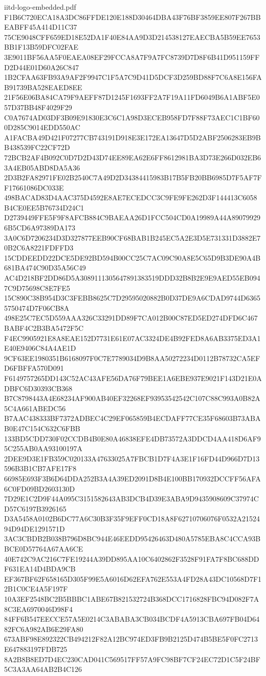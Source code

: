 \begin{filecontents*}[overwrite]{iitd-logo-embedded.pdf}
F1B6C720ECA18A3DC86FFDE120E188D30464DBA43F76BF3859EE807F267BBEABFF45A414D11C37
75CE9048CFF659ED18E52DA1F40E84AA9D3D214538127EAECBA5B59EE7653BB1F13B59DFC02FAE
3E9011BF56AA5F0EAEA08EF29FCCA8A7F9A7FC8739D7D8F6B41D951159FFD2D44E01D60A26C847
1B2CFAA63FB93A9AF2F9947C1F5A7C9D41D5DCF3D259BD88F7C6A8E156FAB91739BA528EAED8EE
21F56E06BA84CA79F9AEFF87D1245F1693FF2A7F19A11FD6049B6A1ABF5E057D37BB48F4029F29
C0A7674AD03DF3B09E91830E3C6C1A98D3ECEB958FD7F88F73AEC1C1BF600D285C9014EDD550AC
A1FACBA49D421F07277CB743191D918E3E172EA13647D5D2ABF2506283EB9BB438539FC22CF72D
72BCB2AF4B092C0D7D2D43D74EE89EA62E6FF8612981BA3D73E266D032EB63A4EB05ABD8DA5A36
2D3B2FA82971FE02B2540C7A49D2D34384415983B17B5FB20BB6985D7F5AF7FF17661086DC033E
498BACAD83D4AAC375D4592E8AE7ECEDCC3C9FE9FE262D3F144413C6058B4CE0EE5B76734D24C1
D2739449FFE5F9F8AFCB884C9BAEAA26D1FCC504CD0A19989A44A890799296B5CD6A97389DA173
3A0C6D7206234D3D327877EEB90CF68BAB1B245EC5A2E3D5E731331D3882E70B2C6A8221FDFFD3
15CDDEEDD22DCE5DE92BD594B00CC25C7AC09C90A8E5C65D9B3DE90A4B681BA474C90D35A56C49
AC4D218BF2DD86D5A3089111305647891383519DDD32B8B2E9E9AED55EB0947C9D75698C8E7FE5
15C890C38B954D3C3FEBB8625C7D29595020882B0D37DE9A6CDAD9744D63655750474D7F06CB8A
498E25C7EC5D559AAA326C33291DD89F7CA012B00C87ED5ED274DFD6C467BABF4C2B3BA5472F5C
F4EC9905921E8A8EAE152D7731E61E07AC3324DE4B92FED8A6AB3375ED3A1E40E9406C84A4AE1D
9CF63EE1980351B6168097F0C7E7789034D9B8AA50272234D0112B78732CA5EFD6FBFFA570D091
F6149757265DD143C52AC43AFE56DA76F79BEE1A6EBE937E9021F143D21E0ADBFC6D30393CB368
B7C8798443A4E68234AF900AB40EF32268EF93953542542C107C88C993A0B82A5C4A661ABEDC56
B7AAC438333BF7372ADBEC4C29EF065859B4ECDAFF77CE35F68603B73ABAB0E47C154C632C6FBB
133BD5CDD730F02CCDB4B0E80A46838EFE4DB73572A3DDCD4AA418D6AF95C255AB0AA93100197A
2DEE9D3E1FB359C020133A47633025A7FBCB1D7F4A3E1F16FD44D966D7D13596B3B1CB7AFE17F8
66985E693F3B6D64DDA252B3A4A39ED2091D8B4E100BB170932DCCFF56AFA6C0FD09BD2603130D
7D29E1C2D9F44A095C3151582643AB3DCB4D39E3ABA9D9435908609C37974CD57C6197B3926165
D3A5458A0102B6DC77A6C30B3F35F9EFF0CD18A8F62710706076F0532A2152494D94DE1291571D
3AC3CBDB2B038B796D8BC944E46EEDD95426463D480A5785EBA8C4CCA93BBCE0D57764A67AA6CE
40E742C9AC216C7FE19244A39DD895AA10C6402862F3528F91FA7F8BC688DDF631EA14D4BDA9CB
EF367BF62F658165D305F99E5A6016D62EFA762E553A4FD28A43DC10568D7F12B1C0CE4A5F197F
10A3EF2548BC2B5BBBC1ABE67B821532724B368DCC1716828FBC94D082F7A8C3EA6970046D98F4
84FF6B547EECCE57A5E0214C3ABABA3CB034BCDF4A5913CBA697FB04D6482FC6A982AB6E29FA80
673ABF98E892322CB494212F82A12BC974ED3FB9B2125D474B5BE5F0FC2713E647883197FDB725
8A2B8B8ED7D4EC230CAD041C569517FF57A9FC98BF7CF24EC72D1C5F24BF5C3A3AA64AB2B4C126

\end{filecontents*}

